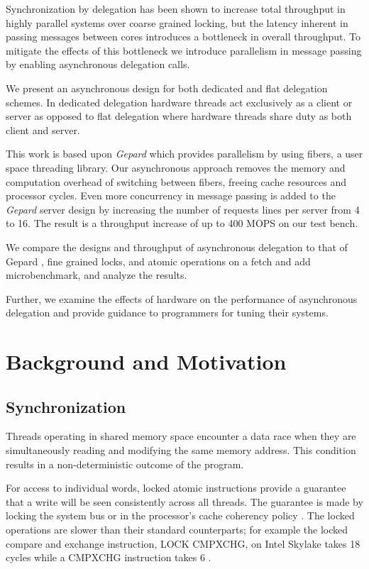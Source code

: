 \documentclass{uicthesi}
\begin{document}
\summary
Synchronization by delegation has been shown to increase total throughput in highly parallel systems over coarse grained locking, \cite{ffwd} but the latency inherent in passing messages between cores introduces a bottleneck in overall throughput. To mitigate the effects of this bottleneck we introduce parallelism in message passing by enabling asynchronous delegation calls. 

We present an asynchronous design for both dedicated and flat delegation schemes. In dedicated delegation hardware threads act exclusively as a client or server as opposed to flat delegation where hardware threads share duty as both client and server. 

This work is based upon \textit{Gepard} which provides parallelism by using fibers, a user space threading library. Our asynchronous approach removes the memory and computation overhead of switching between fibers, freeing cache resources and processor cycles. Even more concurrency in message passing is added to the \textit{Gepard} server design by increasing the number of requests lines per server from 4 to 16. The result is a throughput increase of up to 400 MOPS on our test bench.  

We compare the designs and throughput of asynchronous delegation to that of Gepard \cite{gepard}, fine grained locks, and atomic operations on a fetch and add microbenchmark, and analyze the results.  

Further, we examine the effects of hardware on the performance of asynchronous delegation and provide guidance to programmers for tuning their systems. 

\chapter{Background and Motivation}
\section{Synchronization}
Threads operating in shared memory space encounter a data race when they are simultaneously reading and modifying the same memory address. This condition results in a non-deterministic outcome of the program. 

For access to individual words, locked atomic instructions provide a guarantee that a write will be seen consistently across all threads. The guarantee is made by locking the system bus or in the processor's cache coherency policy \cite{IntelDevelopersManual}. The locked operations are slower than their standard counterparts; for example the locked compare and exchange instruction, LOCK CMPXCHG, on Intel Skylake takes 18 cycles while a CMPXCHG  instruction takes 6 \cite{agner}. 
\end{document}
